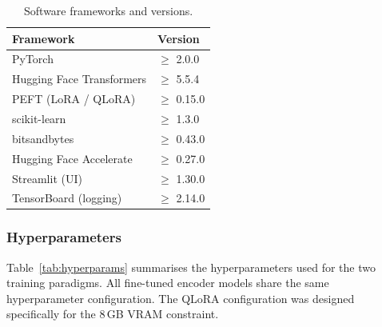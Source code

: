 \documentclass[conference]{IEEEtran}
\begin{document}
\begin{table}[t]
\centering
\caption{Software frameworks and versions.}
\label{tab:software}
\begin{tabular}{ll}
\hline
\textbf{Framework}        & \textbf{Version} \\
\hline
PyTorch                    & $\geq$ 2.0.0 \\
Hugging Face Transformers  & $\geq$ 5.5.4 \\
PEFT (LoRA / QLoRA)        & $\geq$ 0.15.0 \\
scikit-learn               & $\geq$ 1.3.0 \\
bitsandbytes               & $\geq$ 0.43.0 \\
Hugging Face Accelerate    & $\geq$ 0.27.0 \\
Streamlit (UI)             & $\geq$ 1.30.0 \\
TensorBoard (logging)      & $\geq$ 2.14.0 \\
\hline
\end{tabular}
\end{table}

\subsubsection{Hyperparameters}
Table~\ref{tab:hyperparams} summarises the hyperparameters used for the
two training paradigms.  All fine-tuned encoder models share the same
hyperparameter configuration.  The QLoRA configuration was designed
specifically for the 8\,GB VRAM constraint.
\end{document}
